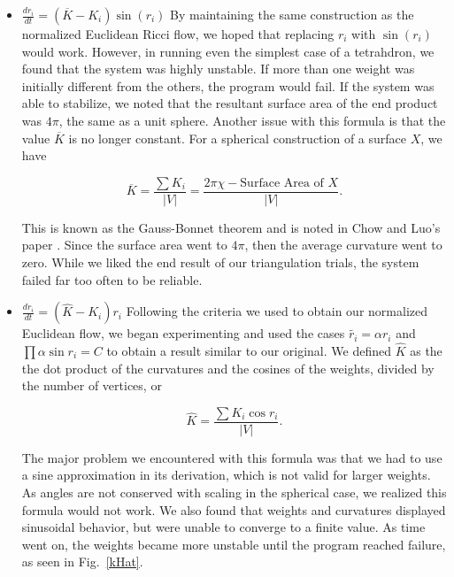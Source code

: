 \documentclass[12pt]{article}
\begin{document}
\begin{itemize}
\item $\displaystyle \frac{dr_i}{dt} = (\overline{K} - K_i)\sin(r_i)$ \newline
\noindent By maintaining the same construction as the normalized Euclidean Ricci flow, we hoped that replacing $r_i$ with $\sin(r_i)$ would work. However, in running even the simplest case of a tetrahdron, we found that the system was highly unstable. If more than one weight was initially different from the others, the program would fail. If the system was able to stabilize, we noted that the resultant surface area of the end product was $4\pi$, the same as a unit sphere. Another issue with this formula is that the value $\overline{K}$ is no longer constant. For a spherical construction of a surface $X$, we have 

$$\overline{K} = \frac{\sum{K_i}}{|V|} = \frac{2\pi\chi - \mbox{Surface Area of }X}{|V|}.$$

\noindent This is known as the Gauss-Bonnet theorem and is noted in Chow and Luo's paper \cite{chowluo}. Since the surface area went to $4\pi$, then the average curvature went to zero. While we liked the end result of our triangulation trials, the system failed far too often to be reliable. 

\item $\displaystyle \frac{dr_i}{dt} = (\hat{K} - K_i)r_i$ \newline
\noindent Following the criteria we used to obtain our normalized Euclidean flow, we began experimenting and used the cases $\tilde{r_i} = \alpha r_i$ and $\prod{\alpha \sin r_i} = C$ to obtain a result similar to our original. We defined $\hat{K}$ as the the dot product of the curvatures and the cosines of the weights, divided by the number of vertices, or 

$$\hat{K} = \frac{\sum{K_i \cos r_i}}{|V|}.$$

\noindent The major problem we encountered with this formula was that we had to use a sine approximation in its derivation, which is not valid for larger weights. As angles are not conserved with scaling in the spherical case, we realized this formula would not work. We also found that weights and curvatures displayed sinusoidal behavior, but were unable to converge to a finite value. As time went on, the weights became more unstable until the program reached failure, as seen in Fig.~\ref{kHat}.


\end{itemize}
\end{document}
